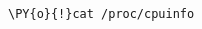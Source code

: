 {\par%
\vspace{-1\baselineskip}%
}%
\begin{notebookcell}[29]%
\begin{addmargin}[\cellleftmargin]{0em}%
{\smaller%
\par%
%
\vspace{-1\smallerfontscale}%
\begin{Verbatim}[commandchars=\\\{\}]
\PY{o}{!}cat /proc/cpuinfo
\end{Verbatim}
%
\par%
\vspace{-1\smallerfontscale}}%
\end{addmargin}
\end{notebookcell}


